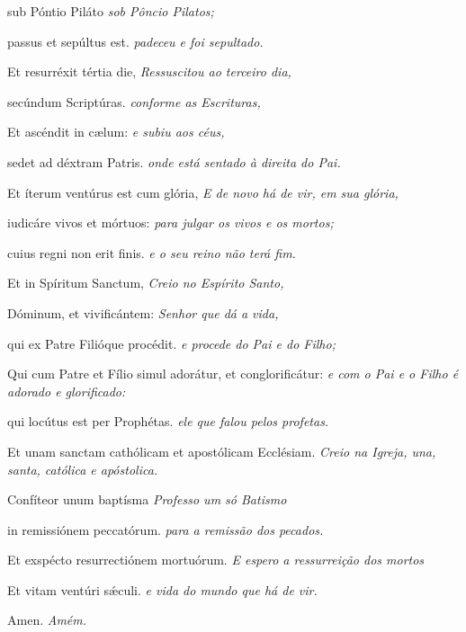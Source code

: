\begin{paracol}{2}
  sub Póntio Piláto
  \switchcolumn
  \emph{sob Pôncio Pilatos;}
  \switchcolumn*

  passus et sepúltus est.
  \switchcolumn
  \emph{padeceu e foi sepultado.}
  \switchcolumn*

  Et resurréxit tértia die,
  \switchcolumn
  \emph{Ressuscitou ao terceiro dia,}
  \switchcolumn*

  secúndum Scriptúras.
  \switchcolumn
  \emph{conforme as Escrituras,}
  \switchcolumn*

  Et ascéndit in c{\ae}lum:
  \switchcolumn
  \emph{e subiu aos céus,}
  \switchcolumn*

  sedet ad déxtram Patris.
  \switchcolumn
  \emph{onde está sentado à direita do Pai.}
  \switchcolumn*

  Et íterum ventúrus est cum glória,
  \switchcolumn
  \emph{E de novo há de vir, em sua glória,}
  \switchcolumn*

  iudicáre vivos et mórtuos:
  \switchcolumn
  \emph{para julgar os vivos e os mortos;}
  \switchcolumn*

  cuius regni non erit finis.
  \switchcolumn
  \emph{e o seu reino não terá fim.}
  \switchcolumn*

  Et in Spíritum Sanctum,
  \switchcolumn
  \emph{Creio no Espírito Santo,}
  \switchcolumn*

  Dóminum, et vivificántem:
  \switchcolumn
  \emph{Senhor que dá a vida,}
  \switchcolumn*

  qui ex Patre Filióque procédit.
  \switchcolumn
  \emph{e procede do Pai e do Filho;}
  \switchcolumn*

  Qui cum Patre et Fílio simul adorátur, et conglorificátur:
  \switchcolumn
  \emph{e com o Pai e o Filho é adorado e glorificado:}
  \switchcolumn*

  qui locútus est per Prophétas.
  \switchcolumn
  \emph{ele que falou pelos profetas.}
  \switchcolumn*

  Et unam sanctam cathólicam et apostólicam Ecclésiam.
  \switchcolumn
  \emph{Creio na Igreja, una, santa, católica e apóstolica.}
  \switchcolumn*

  Confíteor unum baptísma
  \switchcolumn
  \emph{Professo um só Batismo}
  \switchcolumn*

  in remissiónem peccatórum.
  \switchcolumn
  \emph{para a remissão dos pecados.}
  \switchcolumn*

  Et exspécto resurrectiónem mortuórum.
  \switchcolumn
  \emph{E espero a ressurreição dos mortos}
  \switchcolumn*

  Et vitam ventúri s\'{\ae}culi.
  \switchcolumn
  \emph{e vida do mundo que há de vir.}
  \switchcolumn*

  Amen.
  \switchcolumn
  \emph{Amém.}
\end{paracol}

